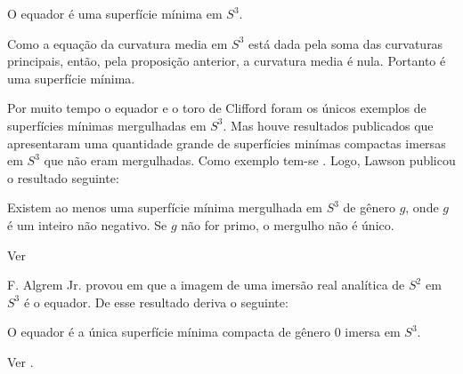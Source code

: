 \begin{corolario}
	O equador é uma superfície mínima em $S^3$.
\end{corolario}

\begin{demonstracao}
	Como a equação da curvatura media em $S^3$ está dada pela soma das curvaturas principais, então, pela proposição anterior, a curvatura media é nula. Portanto é uma superfície mínima.
\end{demonstracao}


Por muito tempo o equador e o toro de Clifford foram os únicos exemplos de superfícies mínimas mergulhadas em $S^3$. Mas houve resultados publicados que apresentaram uma quantidade grande de superfícies minímas compactas imersas em $S^3$ que não eram mergulhadas. Como exemplo tem-se \cite{Lawson1969}. Logo, Lawson publicou o resultado seguinte:

\begin{teorema}[Lawson]
	Existem ao menos uma superfície mínima mergulhada em $S^3$ de gênero $g$, onde $g$ é um inteiro não negativo. Se $g$ não for primo, o mergulho não é único.
\end{teorema}

\begin{demonstracao}
	Ver \cite[Theorem 2]{Lawson1970}
\end{demonstracao}



F. Algrem Jr. provou em \cite{Almgren1966} que a imagem de uma imersão real analítica de $S^2$ em $S^3$ é o equador. De esse resultado deriva o seguinte:

\begin{teorema}[Almgren]
	O equador é a única superfície mínima compacta de gênero 0 imersa em $S^3$.
\end{teorema}

\begin{demonstracao}
	Ver \cite[Lemma 1]{Almgren1966}.
\end{demonstracao}

